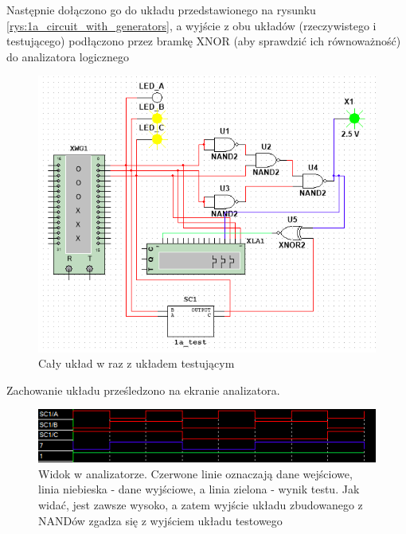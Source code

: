 \documentclass[12pt,a4paper,openright]{mwrep}
\begin{document}
Następnie dołączono go do układu przedstawionego na rysunku
\ref{rys:1a_circuit_with_generators}, a wyjście z obu układów
(rzeczywistego i testującego) podłączono przez bramkę
XNOR (aby sprawdzić ich równoważność) do analizatora logicznego

\begin{figure}[H]
    \centering
    \includegraphics[width=1\textwidth]{images/1a_circuit_with_test.png}
    \caption{Cały układ w raz z układem testującym}
    \label{rys:1a_circuit_with_test}
\end{figure}

Zachowanie układu prześledzono na ekranie analizatora.

\begin{figure}[H]
    \centering
    \includegraphics[width=1\textwidth]{images/1a_output_with_test.png}
    \caption{Widok w analizatorze. Czerwone linie oznaczają dane wejściowe, linia niebieska - dane wyjściowe, a linia zielona - wynik testu. Jak widać, jest zawsze wysoko, a zatem wyjście układu zbudowanego z NANDów zgadza się z wyjściem układu testowego}
    \label{rys:1a_output_with_test}
\end{figure}

\newpage
\end{document}
